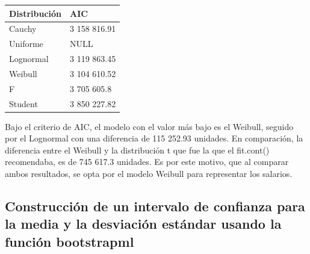 \documentclass[
]{article}
\newenvironment{Shaded}{\begin{snugshade}}{\end{snugshade}}
\newcommand{\AttributeTok}[1]{\textcolor[rgb]{0.13,0.29,0.53}{#1}}
\newcommand{\CommentTok}[1]{\textcolor[rgb]{0.56,0.35,0.01}{\textit{#1}}}
\newcommand{\ControlFlowTok}[1]{\textcolor[rgb]{0.13,0.29,0.53}{\textbf{#1}}}
\newcommand{\FunctionTok}[1]{\textcolor[rgb]{0.13,0.29,0.53}{\textbf{#1}}}
\newcommand{\NormalTok}[1]{#1}
\newcommand{\OtherTok}[1]{\textcolor[rgb]{0.56,0.35,0.01}{#1}}
\newcommand{\SpecialCharTok}[1]{\textcolor[rgb]{0.81,0.36,0.00}{\textbf{#1}}}
\begin{document}
\begin{Shaded}
\end{Shaded}

\begin{longtable}[]{@{}ll@{}}
\toprule\noalign{}
Distribución & AIC \\
\midrule\noalign{}
\endhead
\bottomrule\noalign{}
\endlastfoot
Cauchy & 3 158 816.91 \\
Uniforme & NULL \\
Lognormal & 3 119 863.45 \\
Weibull & 3 104 610.52 \\
F & 3 705 605.8 \\
Student & 3 850 227.82 \\
\end{longtable}

Bajo el criterio de AIC, el modelo con el valor más bajo es el Weibull,
seguido por el Lognormal con una diferencia de 115 252.93 unidades. En
comparación, la diferencia entre el Weibull y la distribución t que fue
la que el fit.cont() recomendaba, es de 745 617.3 unidades. Es por este
motivo, que al comparar ambos resultados, se opta por el modelo Weibull
para representar los salarios.

\hypertarget{construcciuxf3n-de-un-intervalo-de-confianza-para-la-media-y-la-desviaciuxf3n-estuxe1ndar-usando-la-funciuxf3n-bootstrapml}{%
\subsection{Construcción de un intervalo de confianza para la media y la
desviación estándar usando la función
bootstrapml}\label{construcciuxf3n-de-un-intervalo-de-confianza-para-la-media-y-la-desviaciuxf3n-estuxe1ndar-usando-la-funciuxf3n-bootstrapml}}

\begin{Shaded}
\end{Shaded}
\end{document}
